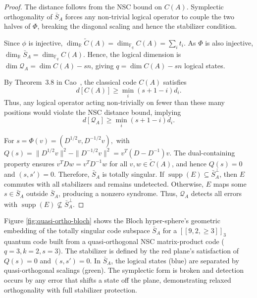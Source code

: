 \documentclass{iopjournal}
\theoremstyle{thmstyleone}%
\theoremstyle{thmstyletwo}%
\theoremstyle{thmstylethree}%
\begin{document}
\begin{proof}
The distance follows from the NSC bound on $C(A)$.  
Symplectic orthogonality of $\bar{S}_A$ forces any non-trivial logical operator to couple the two halves of $\Phi$, breaking the diagonal scaling and hence the stabilizer condition.
 
Since $\phi$ is injective, $\dim_{\mathbb{R}} \tilde{C}(A) = \dim_{\mathbb{F}_q} C(A) = \sum_i t_i$.  
As $\Phi$ is also injective, $\dim_{\mathbb{R}}\bar{S}_A = \dim_{\mathbb{F}_q} C(A)$.  
Hence, the logical dimension is $\dim \mathcal{Q}_A = \dim C(A) - sn$, giving $q={\dim C(A) - sn}$ logical states.

By Theorem~3.8 in Cao~\cite{Cao2020quantum}, the classical code $C(A)$ satisfies
\begin{equation}
d[C(A)] \ge \min_i (s+1-i)d_i.
\end{equation}
Thus, any logical operator acting non-trivially on fewer than these many positions would violate the NSC distance bound, implying
\begin{equation}
d[\mathcal{Q}_A] \ge \min_i (s+1-i)d_i.
\end{equation}
  
For $ s = \Phi(v) = (D^{1/2}v, D^{-1/2}v),$ with ~
$Q(s) = \|D^{1/2}v\|^2 - \|D^{-1/2}v\|^2 = v^T(D - D^{-1})v$.
The dual-containing property ensures $v^T D w = v^T D^{-1} w$ for all $v,w \in \tilde{C}(A)$, and hence $Q(s)=0$ and $(s,s')=0$. Therefore, $\bar{S}_A$ is totally singular.
If $\operatorname{supp}(E) \subseteq \bar{S}_A^\perp$, then $E$ commutes with all stabilizers and remains undetected.  
Otherwise, $E$ maps some $s \in \bar{S}_A$ outside $\bar{S}_A$, producing a nonzero syndrome.  
Thus, $\mathcal{Q}_A$ detects all errors with $\operatorname{supp}(E) \not\subseteq \bar{S}_A^\perp$.
\end{proof}


Figure \ref{fig:quasi-ortho-bloch} shows the Bloch hyper-sphere's geometric embedding of the totally singular code subspace $\bar{S}_A$ for a $[[9,2,\geq3]]_3$ quantum code built from a quasi-orthogonal NSC matrix-product code ($q=3,k=2,s=3$).  The stabilizer is defined by the red plane's satisfaction of $Q(s)=0$ and $(s,s')=0$.  In $\bar{S}_A$, the logical states (blue) are separated by quasi-orthogonal scalings (green).  The symplectic form is broken and detection occurs by any error that shifts a state off the plane, demonstrating relaxed orthogonality with full stabilizer protection.
\end{document}

